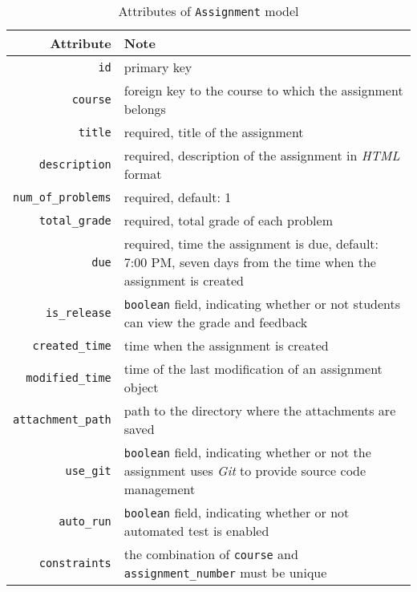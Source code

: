 \begin{table}[ht]
    \centering
    \caption{Attributes of \texttt{Assignment} model}
    \label{tab:ASM_ATTR}
    \renewcommand{\arraystretch}{1.3}
    \begin{tabular}[ht]{r|p{4in}}
        \hline
        Attribute & Note \\
        \hline
        \hline

        \texttt{id} & primary key \\
        \hline
        \texttt{course} & foreign key to the course to which the assignment
            belongs \\
        \hline
        \hline

        \texttt{title} & required, title of the assignment\\
        \hline
        \texttt{description} & required, description of the assignment 
            in \emph{HTML} format \\
        \hline
        \texttt{num\_of\_problems} & required, default: 1 \\
        \hline
        \texttt{total\_grade} & required, total grade of each problem \\
        \hline
        \texttt{due} & required, time the assignment is due, default: 7:00 PM,
            seven days  from the time when the assignment is created \\
        \hline
        \texttt{is\_release} & \texttt{boolean} field, indicating whether or not
            students can view the grade and feedback \\
        \hline
        \texttt{created\_time} & time when the assignment is created \\
        \hline
        \texttt{modified\_time} & time of the last modification of an assignment
            object\\
        \hline
        \texttt{attachment\_path} & path to the directory where the attachments
            are saved \\
        \hline
        \hline

        \texttt{use\_git} & \texttt{boolean} field, indicating whether or not
            the  assignment uses \emph{Git} to provide source code management \\
        \hline
        \texttt{auto\_run} & \texttt{boolean} field, indicating whether or not
            automated test  is enabled \\
        \hline
        \hline

        \texttt{constraints} & the combination of \texttt{course} and \texttt{assignment\_number}
            must  be unique \\
        \hline
    \end{tabular}
    \renewcommand{\arraystretch}{1}
\end{table}

